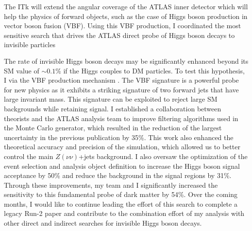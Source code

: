\documentclass[a4paper]{article}
\begin{document}
The ITk will extend the angular coverage of the ATLAS inner detector which will help the physics of forward objects, such as the case of Higgs boson production in vector boson fusion (VBF). Using this VBF production, I coordinated the most sensitive search that drives the ATLAS direct probe of Higgs boson decays to invisible particles


The rate of invisible Higgs boson decays may be significantly enhanced beyond its SM value of $\sim0.1\%$ if the Higgs couples to DM particles.
To test this hypothesis, I  via the VBF production mechanism \cite{vbfMET_CONF2020}. The VBF signature is a powerful probe for new physics as it exhibits a striking signature of two forward jets that have large invariant mass. This signature can be exploited to reject large SM backgrounds while retaining signal. I established a collaboration between theorists and the ATLAS analysis team to improve filtering algorithms used in the Monte Carlo generator, which resulted in the reduction of the largest uncertainty in the previous publication by 35\%. This work also enhanced the theoretical accuracy and precision of the simulation, which allowed us to better control the main $Z\left(\nu\nu\right)$+jets background.
I also oversaw the optimization of the event selection and analysis object definition to increase the Higgs boson signal acceptance by 50\% and reduce the background in the signal regions by 31\%. Through these improvements, my team and I significantly increased the sensitivity to this fundamental probe of dark matter by 54\%. Over the coming months, I would like to continue leading the effort of this search to complete a
legacy Run-2 paper and contribute to the combination effort of my analysis with other direct and indirect searches for invisible Higgs boson decays.
\end{document}

